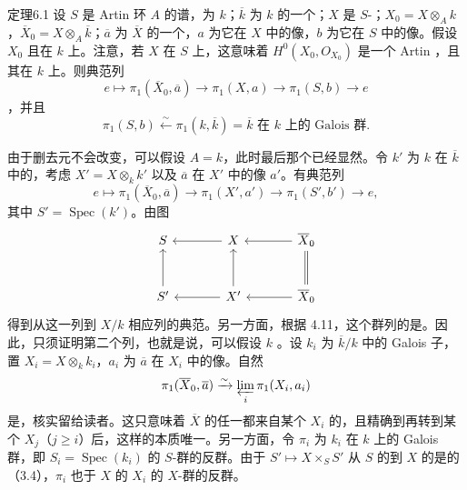 \begin{SGAresult}{定理}{6.1}
设 $S$ 是 Artin 环 $A$ 的谱，为 $k$；$\overline k$ 为 $k$ 的一个；$X$ 是 $S$-；$X_0=X\otimes_A k$，$\overline X_0=X\otimes_A\overline k$；$\overline a$ 为 $\overline X$ 的一个，$a$ 为它在 $X$ 中的像，$b$ 为它在 $S$ 中的像。假设 $X_0$ 且在 $k$ 上。注意，若 $X$ 在 $S$ 上，这意味着 $H^0(X_0,O_{X_0})$ 是一个 Artin ，且其在 $k$ 上。则典范列
\[
e\longmapsto\pi_1(\overline X_0,\overline a)
\longrightarrow\pi_1(X,a)\longrightarrow\pi_1(S,b)\longrightarrow e
\]
，并且
\[
\pi_1(S,b)\xleftarrow{\sim}\pi_1(k,\overline k)
=\overline k\text{ 在 }k\text{ 上的 Galois 群}.
\]
\end{SGAresult}
由于删去元不会改变，可以假设 $A=k$，此时最后那个已经显然。令 $k'$ 为 $k$ 在 $\overline k$ 中的，考虑 $X'=X\otimes_k k'$ 以及 $\overline a$ 在 $X'$ 中的像 $a'$。有典范列
\[
e\longmapsto\pi_1(\overline X_0,\overline a)
\longrightarrow\pi_1(X',a')\longrightarrow\pi_1(S',b')\longrightarrow e,
\]
其中 $S'=\operatorname{Spec}(k')$。由图
\[
\begin{tikzcd}[column sep=large,row sep=large]
S&X\arrow[l]&\overline X_0\arrow[l]\\
S'\arrow[u]&X'\arrow[l]\arrow[u]&\overline X_0\arrow[l]\arrow[u,equal]
\end{tikzcd}
\]
得到从这一列到 $X/k$ 相应列的典范。另一方面，根据 4.11，这个群列的是。因此，只须证明第二个列，也就是说，可以假设 $k$ 。设 $k_i$ 为 $\overline k/k$ 中的 Galois 子，置 $X_i=X\otimes_k k_i$，$a_i$ 为 $\overline a$ 在 $X_i$ 中的像。自然
\[
\pi_1(\overline X_0,\overline a)\xrightarrow{\sim}\varprojlim_i\pi_1(X_i,a_i)
\]
是，核实留给读者。这只意味着 $\overline X$ 的任一都来自某个 $X_i$ 的，且精确到再转到某个 $X_j$（$j\geq i$）后，这样的本质唯一。另一方面，令 $\pi_i$ 为 $k_i$ 在 $k$ 上的 Galois 群，即 $S_i=\operatorname{Spec}(k_i)$ 的 $S$-群的反群。由于 $S'\mapsto X\times_S S'$ 从 $S$ 的到 $X$ 的是的（3.4），$\pi_i$ 也于 $X$ 的 $X_i$ 的 $X$-群的反群。

